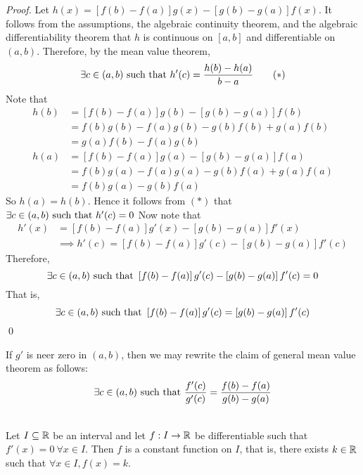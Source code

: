 \begin{proof}
    Let $h(x) = \left[f(b)-f(a)\right]g(x) - \left[g(b)-g(a)\right]f(x).$ It follows from the assumptions, the algebraic continuity theorem, and the algebraic differentiability theorem that $h$ is continuous on $[a,b]$ and differentiable on $(a,b)$. Therefore, by the mean value theorem,
    \begin{equation*}
        \exists c \in (a,b) \text{ such that } h'(c) = \frac{h(b) - h(a)}{b - a}
        \tag{$*$}
    \end{equation*}
    Note that
    \begin{align*}
        h(b) &= \left[f(b) - f(a)\right]g(b) - \left[g(b) - g(a)\right]f(b) \\ 
        &= f(b)g(b) - f(a)g(b) - g(b)f(b) + g(a)f(b) \\
        &= g(a)f(b) - f(a)g(b) \\
        h(a) &= \left[f(b) - f(a)\right]g(a) - \left[g(b)-g(a)\right]f(a) \\
        &= f(b)g(a) - f(a)g(a) - g(b)f(a) + g(a)f(a) \\
        &= f(b)g(a) - g(b)f(a)
    \end{align*}
    So $h(a)=h(b)$. Hence it follows from $(*)$ that 
    $\exists c \in (a,b) \text{ such that } h'(c) = 0$
    Now note that
    \begin{align*}
        h'(x) &= \left[f(b) - f(a)\right]g'(x) - \left[g(b) - g(a)\right]f'(x) \\
        &\implies h'(c) = \left[f(b) - f(a)\right]g'(c) - \left[g(b) - g(a)\right]f'(c)
    \end{align*}
    Therefore,
    $$
    \exists c \in (a,b) \text{ such that } \left[f(b) - f(a)\right]g'(c) - \left[g(b) - g(a)\right]f'(c) = 0
    $$
    That is,
    $$
    \exists c \in (a,b) \text{ such that } \left[f(b) - f(a)\right]g'(c) =\left[g(b) - g(a)\right]f'(c)
    $$
    \qed
\end{proof}

\begin{remark}
    If $g'$ is neer zero in $(a,b)$, then we may rewrite the claim of general mean value theorem as follows:
    $$
    \exists c \in (a,b) \text{ such that } \frac{f'(c)}{g'(c)} = \frac{f(b) - f(a)}{g(b) - g(a)}
    $$
\end{remark}

\begin{theorem} \leavevmode\\
    \label{Thm5.11b}
    Let $I\subseteq \mathbb{R}$ be an interval and let $f: I \to \mathbb{R}$ be differentiable such that $f'(x) = 0 ~\forall x \in I.$ Then $f$ is a constant function on $I$, that is, there exists $k\in \mathbb{R}$ such that $\forall x \in I, f(x) = k$.
\end{theorem}

